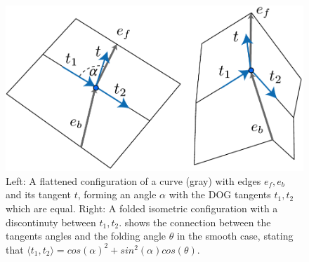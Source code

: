 \begin{figure} [h]
	\centering
	\includegraphics[width=\linewidth]{figures/fold_angle_and_tangent_angles}
	\caption{Left: A flattened configuration of a curve (gray) with edges $e_f,e_b$ and its tangent $t$, forming an angle $\alpha$ with the DOG tangents $t_1,t_2$ which are equal. Right: A folded isometric configuration with a discontinuty between $t_1,t_2$.  shows the connection between the tangents angles and the folding angle $\theta$ in the smooth case, stating that $\langle t_1, t_2 \rangle = cos(\alpha)^2 + sin^2(\alpha) cos(\theta)$. }
	\label{fig:fold_angle_and_tangent_angles}
\end{figure}

